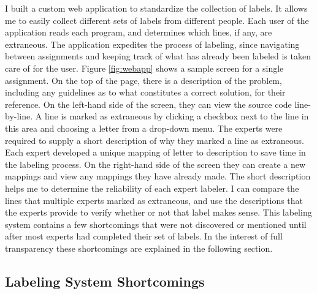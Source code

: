 \documentclass[draft]{article}
\begin{document}
I built a custom web application to standardize the collection of labels. It allows me to easily collect different sets of labels from different people. Each user of the application reads each program, and determines which lines, if any, are extraneous. The application expedites the process of labeling, since navigating between assignments and keeping track of what has already been labeled is taken care of for the user. Figure \ref{fig:webapp} shows a sample screen for a single assignment. On the top of the page, there is a description of the problem, including any guidelines as to what constitutes a correct solution, for their reference. On the left-hand side of the screen, they can view the source code line-by-line. A line is marked as extraneous by clicking a checkbox next to the line in this area and choosing a letter from a drop-down menu. The experts were required to supply a short description of why they marked a line as extraneous. Each expert developed a unique mapping of letter to description to save time in the labeling process. On the right-hand side of the screen they can create a new mappings and view any mappings they have already made. The short description helps me to determine the reliability of each expert labeler. I can compare the lines that multiple experts marked as extraneous, and use the descriptions that the experts provide to verify whether or not that label makes sense. This labeling system contains a few shortcomings that were not discovered or mentioned until after most experts had completed their set of labels. In the interest of full transparency these shortcomings are explained in the following section. 

\subsection{Labeling System Shortcomings}
\end{document}
